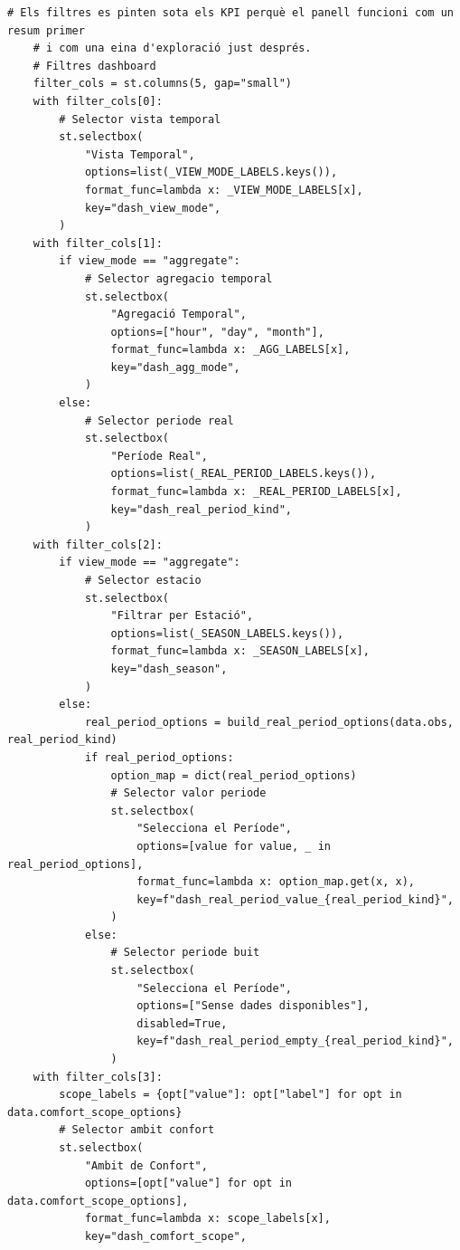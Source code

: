 \documentclass[10pt,a4paper]{article}
\begin{document}
\begin{lstlisting}[style=studioPython,caption={page\_components/resultats\_dashboard.py},label={lst:page-components-resultats-dashboard-py}]
    # Els filtres es pinten sota els KPI perquè el panell funcioni com un resum primer
    # i com una eina d'exploració just després.
    # Filtres dashboard
    filter_cols = st.columns(5, gap="small")
    with filter_cols[0]:
        # Selector vista temporal
        st.selectbox(
            "Vista Temporal",
            options=list(_VIEW_MODE_LABELS.keys()),
            format_func=lambda x: _VIEW_MODE_LABELS[x],
            key="dash_view_mode",
        )
    with filter_cols[1]:
        if view_mode == "aggregate":
            # Selector agregacio temporal
            st.selectbox(
                "Agregació Temporal",
                options=["hour", "day", "month"],
                format_func=lambda x: _AGG_LABELS[x],
                key="dash_agg_mode",
            )
        else:
            # Selector periode real
            st.selectbox(
                "Període Real",
                options=list(_REAL_PERIOD_LABELS.keys()),
                format_func=lambda x: _REAL_PERIOD_LABELS[x],
                key="dash_real_period_kind",
            )
    with filter_cols[2]:
        if view_mode == "aggregate":
            # Selector estacio
            st.selectbox(
                "Filtrar per Estació",
                options=list(_SEASON_LABELS.keys()),
                format_func=lambda x: _SEASON_LABELS[x],
                key="dash_season",
            )
        else:
            real_period_options = build_real_period_options(data.obs, real_period_kind)
            if real_period_options:
                option_map = dict(real_period_options)
                # Selector valor periode
                st.selectbox(
                    "Selecciona el Període",
                    options=[value for value, _ in real_period_options],
                    format_func=lambda x: option_map.get(x, x),
                    key=f"dash_real_period_value_{real_period_kind}",
                )
            else:
                # Selector periode buit
                st.selectbox(
                    "Selecciona el Període",
                    options=["Sense dades disponibles"],
                    disabled=True,
                    key=f"dash_real_period_empty_{real_period_kind}",
                )
    with filter_cols[3]:
        scope_labels = {opt["value"]: opt["label"] for opt in data.comfort_scope_options}
        # Selector ambit confort
        st.selectbox(
            "Ambit de Confort",
            options=[opt["value"] for opt in data.comfort_scope_options],
            format_func=lambda x: scope_labels[x],
            key="dash_comfort_scope",

\end{lstlisting}
\end{document}

